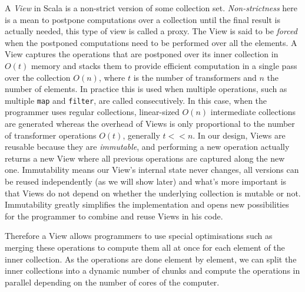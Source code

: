 \documentclass[a4paper,12pt,twocolumn]{article}
\begin{document}
A {\it View}\/ in Scala is a non-strict version of some collection set.
{\it Non-strictness}\/ here is a mean to postpone computations over a collection until the final result is actually needed, this type of view is called a proxy.
The View is said to be {\it forced}\/ when the postponed computations need to be performed over all the elements. %
A View captures the operations that are postponed over its inner collection in $O(t)$ memory and stacks them to provide efficient computation in a single pass over the collection $O(n)$, where $t$ is the number of transformers and $n$ the number of elements.
In practice this is used when multiple operations, such as multiple \verb|map| and \verb|filter|, are called consecutively.
In this case, when the programmer uses regular collections, linear-sized $O(n)$ intermediate collections are generated whereas the overhead of Views is only proportional to the number of transformer operations $O(t)$, generally $t << n$.
In our design, Views are reusable because they are {\it immutable}, and performing a new operation actually returns a new View where all previous operations are captured along the new one.
Immutability means our View's internal state never changes, all versions can be reused independently (as we will show later) and what's more important is that Views do not depend on whether the underlying collection is mutable or not.
Immutability greatly simplifies the implementation and opens new possibilities for the programmer to combine and reuse Views in his code.

Therefore a View allows programmers to use special optimisations such as merging these operations to compute them all at once for each element of the inner collection.
As the operations are done element by element, we can split the inner collections into a dynamic number of chunks and compute the operations in parallel depending on the number of cores of the computer.
\end{document}
